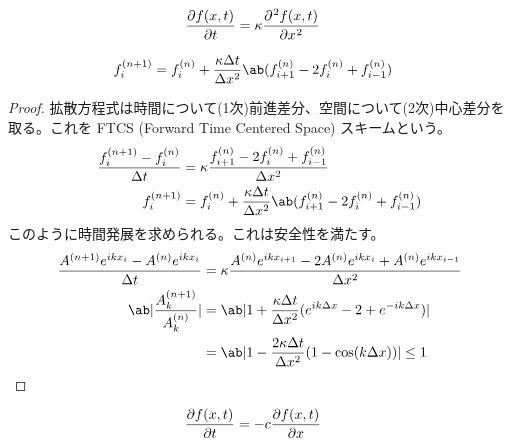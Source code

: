 \documentclass[uplatex,diffipdfmx,a4paper,11pt]{jlreq}
\begin{document}
\begin{definition}[拡散方程式]
  \begin{align}
    \diffp{f(x, t)}{t} & = \kappa\diffp[2]{f(x, t)}{x}
  \end{align}
\end{definition}

\begin{theorem}
  \begin{align}
    f_i^{(n+1)} & = f_i^{(n)} + \frac{\kappa\Delta t}{\Delta x^2}\ab(f_{i+1}^{(n)} - 2f_i^{(n)} + f_{i-1}^{(n)})
  \end{align}
\end{theorem}
\begin{proof}
  拡散方程式は時間について(1次)前進差分、空間について(2次)中心差分を取る。これを FTCS (Forward Time Centered Space) スキームという。
  \begin{align}
    \frac{f_i^{(n+1)} - f_i^{(n)}}{\Delta t} & = \kappa\frac{f_{i+1}^{(n)} - 2f_i^{(n)} + f_{i-1}^{(n)}}{\Delta x^2}                          \\
    f_i^{(n+1)}                              & = f_i^{(n)} + \frac{\kappa\Delta t}{\Delta x^2}\ab(f_{i+1}^{(n)} - 2f_i^{(n)} + f_{i-1}^{(n)})
  \end{align}
  このように時間発展を求められる。これは安全性を満たす。
  \begin{align}
    \frac{A^{(n+1)}e^{ikx_i} - A^{(n)}e^{ikx_i}}{\Delta t} & = \kappa\frac{A^{(n)}e^{ikx_{i+1}} - 2A^{(n)}e^{ikx_{i}} + A^{(n)}e^{ikx_{i-1}}}{\Delta x^2} \\
    \ab|\frac{A_k^{(n+1)}}{A_k^{(n)}}|                     & = \ab|1 + \frac{\kappa\Delta t}{\Delta x^2}(e^{ik\Delta x} - 2 + e^{-ik\Delta x})|           \\
                                                           & = \ab|1 - \frac{2\kappa\Delta t}{\Delta x^2}(1 - \cos(k\Delta x))| \leq 1
  \end{align}
\end{proof}

\begin{definition}[移流方程式]
  \begin{align}
    \diffp{f(x, t)}{t} & = -c\diffp{f(x, t)}{x}
  \end{align}
\end{definition}
\end{document}
